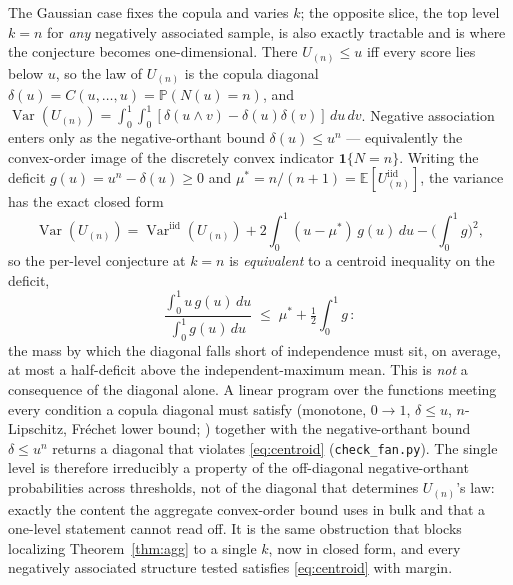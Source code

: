 \documentclass[11pt]{article}
\begin{document}
The Gaussian case fixes the copula and varies $k$; the opposite slice, the top level $k=n$ for
\emph{any} negatively associated sample, is also exactly tractable and is where the conjecture becomes
one-dimensional. There $U_{(n)}\le u$ iff every score lies below $u$, so the law of $U_{(n)}$ is the
copula diagonal $\delta(u)=C(u,\dots,u)=\mathbb P(N(u)=n)$, and
$\operatorname{Var}(U_{(n)})=\int_0^1\!\!\int_0^1[\delta(u\wedge v)-\delta(u)\delta(v)]\,du\,dv$.
Negative association enters only as the negative-orthant bound $\delta(u)\le u^n$
\citep{joagdev1983} --- equivalently the convex-order image of the discretely convex indicator
$\mathbf 1\{N=n\}$. Writing the deficit $g(u)=u^n-\delta(u)\ge 0$ and $\mu^\ast=n/(n+1)=\mathbb
E[U_{(n)}^{\mathrm{iid}}]$, the variance has the exact closed form
\begin{equation}
\operatorname{Var}(U_{(n)})=\operatorname{Var}^{\mathrm{iid}}(U_{(n)})
+2\int_0^1(u-\mu^\ast)\,g(u)\,du-\Big(\int_0^1 g\Big)^{\!2},
\end{equation}
so the per-level conjecture at $k=n$ is \emph{equivalent} to a centroid inequality on the deficit,
\begin{equation}\label{eq:centroid}
\frac{\int_0^1 u\,g(u)\,du}{\int_0^1 g(u)\,du}\;\le\;\mu^\ast+\tfrac12\!\int_0^1 g\,:
\end{equation}
the mass by which the diagonal falls short of independence must sit, on average, at most a half-deficit
above the independent-maximum mean. This is \emph{not} a consequence of the diagonal alone. A linear
program over the functions meeting every condition a copula diagonal must satisfy (monotone, $0\to1$,
$\delta\le u$, $n$-Lipschitz, Fr\'echet lower bound; \citealp{nelsen2006}) together with the negative-orthant
bound $\delta\le u^n$ returns a diagonal that violates \eqref{eq:centroid} (\texttt{check\_fan.py}).
The single level is therefore irreducibly a property of the off-diagonal negative-orthant probabilities
across thresholds, not of the diagonal that determines $U_{(n)}$'s law: exactly the content the
aggregate convex-order bound uses in bulk and that a one-level statement cannot read off. It is the same
obstruction that blocks localizing Theorem~\ref{thm:agg} to a single $k$, now in closed form, and every
negatively associated structure tested satisfies \eqref{eq:centroid} with margin.
\end{document}

